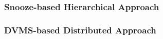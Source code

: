 \subsubsection{Snooze-based Hierarchical Approach}
\label{subsec:snooze}


\vspace*{-.2cm}
\subsubsection{DVMS-based Distributed Approach}
\label{subsec:dvms}




